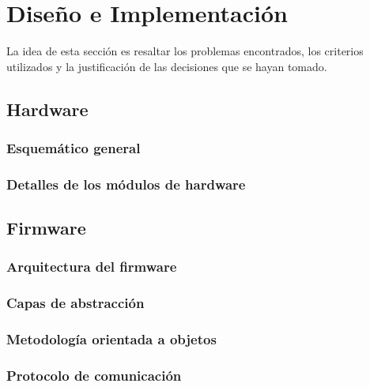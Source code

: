 \chapter{Diseño e Implementación} %

\label{Chapter3} %


La idea de esta sección es resaltar los problemas encontrados, los criterios utilizados y la justificación de las decisiones que se hayan tomado.

\section{Hardware}

\subsection{Esquemático general}

\subsection{Detalles de los módulos de hardware}

\section{Firmware}

\subsection{Arquitectura del firmware}

\subsection{Capas de abstracción}

\subsection{Metodología orientada a objetos}

\subsection{Protocolo de comunicación}

